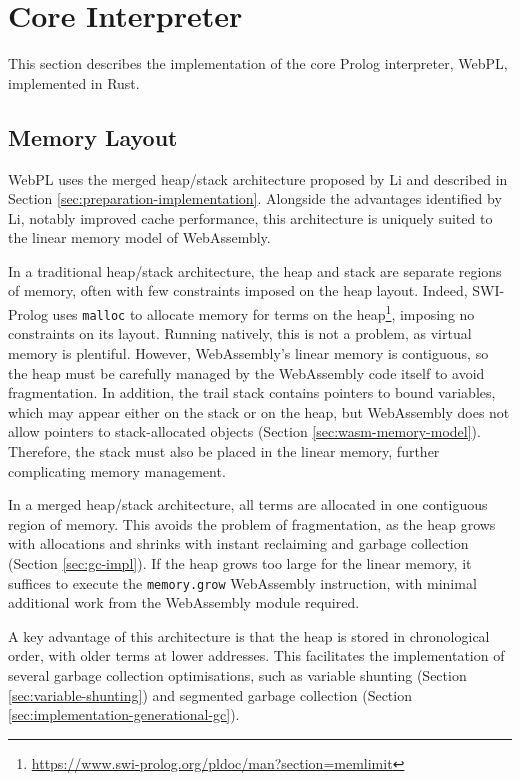 \section{Core Interpreter}

\label{sec:core-interpreter}

This section describes the implementation of the core Prolog interpreter, WebPL, implemented in Rust.

\subsection{Memory Layout}

\label{sec:memory-layout}

WebPL uses the merged heap/stack architecture proposed by Li \cite{liEfficientMemoryManagement2000} and described in Section \ref{sec:preparation-implementation}. Alongside the advantages identified by Li, notably improved cache performance, this architecture is uniquely suited to the linear memory model of WebAssembly.

In a traditional heap/stack architecture, the heap and stack are separate regions of memory, often with few constraints imposed on the heap layout. Indeed, SWI-Prolog uses \texttt{malloc} to allocate memory for terms on the heap\footnote{\url{https://www.swi-prolog.org/pldoc/man?section=memlimit}}, imposing no constraints on its layout. Running natively, this is not a problem, as virtual memory is plentiful. However, WebAssembly's linear memory is contiguous, so the heap must be carefully managed by the WebAssembly code itself to avoid fragmentation. In addition, the trail stack contains pointers to bound variables, which may appear either on the stack or on the heap, but WebAssembly does not allow pointers to stack-allocated objects (Section \ref{sec:wasm-memory-model}). Therefore, the stack must also be placed in the linear memory, further complicating memory management.

In a merged heap/stack architecture, all terms are allocated in one contiguous region of memory. This avoids the problem of fragmentation, as the heap grows with allocations and shrinks with instant reclaiming and garbage collection (Section \ref{sec:gc-impl}). If the heap grows too large for the linear memory, it suffices to execute the \texttt{memory.grow} WebAssembly instruction, with minimal additional work from the WebAssembly module required.

A key advantage of this architecture is that the heap is stored in chronological order, with older terms at lower addresses. This facilitates the implementation of several garbage collection optimisations, such as variable shunting (Section \ref{sec:variable-shunting}) and segmented garbage collection (Section \ref{sec:implementation-generational-gc}).

